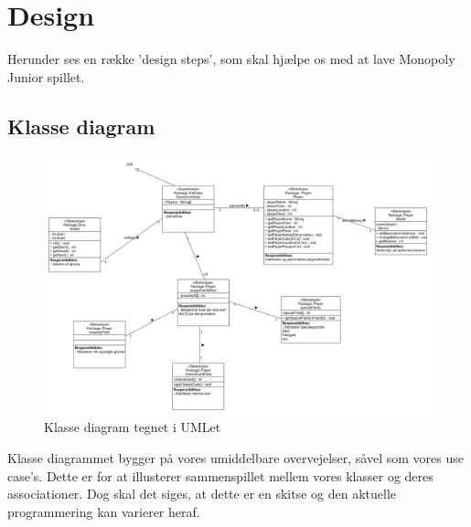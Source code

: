 \section{Design}
    Herunder ses en række 'design steps', som skal hjælpe os med at lave Monopoly 
    Junior spillet.

    \subsection{Klasse diagram}
            \begin{figure}[h]
                \advance\leftskip-3cm
                \includegraphics[width=20cm]{fig/Designklassediagram(3).jpg}
                \caption{Klasse diagram tegnet i UMLet}
            \end{figure}
        Klasse diagrammet bygger på vores umiddelbare overvejelser, såvel som vores use case's.
        Dette er for at illusterer sammenspillet mellem vores klasser og deres associationer.
        Dog skal det siges, at dette er en skitse og den aktuelle programmering kan varierer heraf.


